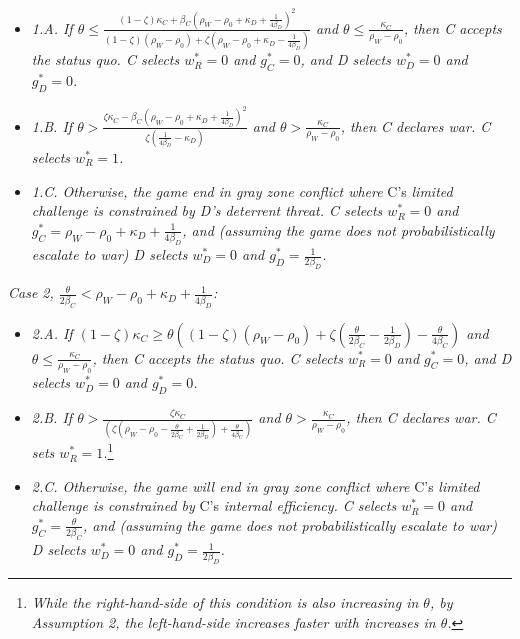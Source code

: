\documentclass[
]{article}
\begin{document}
\begin{itemize}
\item \textit{1.A. If $\theta\leq\frac{(1-\zeta)\kappa_{C}+\beta_{C}\left(\rho_{W}-\rho_{0}+\kappa_{D}+\frac{1}{4\beta_{D}}\right)^{2}}{(1-\zeta)(\rho_{W}-\rho_{0})+\zeta\left(\rho_{W}-\rho_{0}+\kappa_{D}-\frac{1}{4\beta_{D}}\right)}$ and $\theta\leq\frac{\kappa_{C}}{\rho_{W}-\rho_{0}}$, then C accepts the status quo. C selects $w_{R}^{*}=0$ and $g_{C}^{*}=0$, and D selects $w_{D}^{*}=0$ and $g_{D}^{*}=0$. } 
\item \textit{1.B. If $\theta>\frac{\zeta\kappa_{C}-\beta_{C}\left(\rho_{W}-\rho_{0}+\kappa_{D}+\frac{1}{4\beta_{D}}\right)^{2}}{\zeta\left(\frac{1}{4\beta_{D}}-\kappa_{D}\right)}$ and $\theta>\frac{\kappa_{C}}{\rho_{W}-\rho_{0}}$, then C declares war. C selects $w_{R}^{*}=1$.} 
\item \textit{1.C. Otherwise, the game end in gray zone conflict where }C's\textit{ limited challenge is constrained by D's deterrent threat. C selects $w_{R}^{*}=0$ and $g_{C}^{*}=\rho_{W}-\rho_{0}+\kappa_{D}+\frac{1}{4\beta_{D}}$, and (assuming the game does not probabilistically escalate to war) D selects $w_{D}^{*}=0$ and $g_{D}^{*}=\frac{1}{2\beta_{D}}$. } 
\end{itemize}

\textit{Case 2, $\frac{\theta}{2\beta_{C}}<\rho_{W}-\rho_{0}+\kappa_{D}+\frac{1}{4\beta_{D}}$:}

\begin{itemize}
\item \textit{2.A. If $(1-\zeta)\kappa_{C}\geq\theta\left((1-\zeta)(\rho_{W}-\rho_{0})+\zeta\left(\frac{\theta}{2\beta_{C}}-\frac{1}{2\beta_{D}}\right)-\frac{\theta}{4\beta_{C}}\right)$ and $\theta\leq\frac{\kappa_{C}}{\rho_{W}-\rho_{0}}$, then C accepts the status quo. C selects $w_{R}^{*}=0$ and $g_{C}^{*}=0$, and D selects $w_{D}^{*}=0$ and $g_{D}^{*}=0$. } 
\item \textit{2.B. If $\theta>\frac{\zeta\kappa_{C}}{\left(\zeta\left(\rho_{W}-\rho_{0}-\frac{\theta}{2\beta_{C}}+\frac{1}{2\beta_{D}}\right)+\frac{\theta}{4\beta_{C}}\right)}$ and $\theta>\frac{\kappa_{C}}{\rho_{W}-\rho_{0}}$, then C declares war. C sets $w_{R}^{*}=1$.}\footnote{\textit{While the right-hand-side of this condition is also increasing in $\theta$, by Assumption 2, the left-hand-side increases faster with increases in $\theta$.}}\textit{ } 
\item \textit{2.C. Otherwise, the game will end in gray zone conflict where }C's\textit{ limited challenge is constrained by }C's\textit{ internal efficiency. C selects $w_{R}^{*}=0$ and $g_{C}^{*}=\frac{\theta}{2\beta_{C}}$, and (assuming the game does not probabilistically escalate to war) D selects $w_{D}^{*}=0$ and $g_{D}^{*}=\frac{1}{2\beta_{D}}$. } 
\end{itemize}
\end{document}
